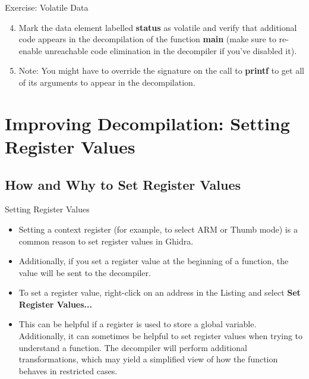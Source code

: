 \documentclass{beamer}
\begin{document}
\begin{frame}
\begin{block}{Exercise: Volatile Data}
\begin{enumerate}
\setcounter{enumi}{3}
\item Mark the data element labelled \textbf{status} as volatile and verify that additional code appears in the decompilation 
of the function \textbf{main} (make sure to re-enable unreachable code elimination in the decompiler if you've disabled it). 
\item Note: You might have to override the signature on the call to \textbf{printf} to get all of its arguments to appear in the decompilation.
\end{enumerate}
\end{block}
\end{frame}

\section{Improving Decompilation: Setting Register Values}

\subsection{How and Why to Set Register Values}
\begin{frame}
\begin{block}{Setting Register Values}
\begin{itemize}
\item Setting a context register (for example, to select ARM or Thumb mode) is a common reason to set register values in Ghidra.
\item Additionally, if you set a register value at the beginning of a function, the value will be sent to the decompiler.
\item To set a register value, right-click on an address in the Listing and select \textbf{Set Register Values...}
\item This can be helpful if a register is used to store a global variable.  Additionally, it can sometimes be helpful to set register values when trying to 
understand a function.  The decompiler will perform additional transformations, which may yield a simplified view of how the function behaves in restricted cases.
\end{itemize}
\end{block}
\end{frame}
\end{document}
